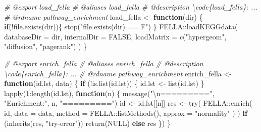 \documentclass[
]{article}
\newenvironment{Shaded}{\begin{snugshade}}{\end{snugshade}}
\newcommand{\AttributeTok}[1]{\textcolor[rgb]{0.77,0.63,0.00}{#1}}
\newcommand{\CommentTok}[1]{\textcolor[rgb]{0.56,0.35,0.01}{\textit{#1}}}
\newcommand{\ConstantTok}[1]{\textcolor[rgb]{0.00,0.00,0.00}{#1}}
\newcommand{\ControlFlowTok}[1]{\textcolor[rgb]{0.13,0.29,0.53}{\textbf{#1}}}
\newcommand{\DecValTok}[1]{\textcolor[rgb]{0.00,0.00,0.81}{#1}}
\newcommand{\FunctionTok}[1]{\textcolor[rgb]{0.00,0.00,0.00}{#1}}
\newcommand{\NormalTok}[1]{#1}
\newcommand{\OtherTok}[1]{\textcolor[rgb]{0.56,0.35,0.01}{#1}}
\newcommand{\SpecialCharTok}[1]{\textcolor[rgb]{0.00,0.00,0.00}{#1}}
\newcommand{\StringTok}[1]{\textcolor[rgb]{0.31,0.60,0.02}{#1}}
\begin{document}
\begin{Shaded}
\begin{Highlighting}[]
\CommentTok{\#\textquotesingle{} @export load\_fella}
\CommentTok{\#\textquotesingle{} @aliases load\_fella}
\CommentTok{\#\textquotesingle{} @description \textbackslash{}code\{load\_fella\}: ...}
\CommentTok{\#\textquotesingle{} @rdname pathway\_enrichment}
\NormalTok{load\_fella }\OtherTok{\textless{}{-}} \ControlFlowTok{function}\NormalTok{(dir) \{}
  \ControlFlowTok{if}\NormalTok{(}\SpecialCharTok{!}\FunctionTok{file.exists}\NormalTok{(dir))\{}
    \FunctionTok{stop}\NormalTok{(}\StringTok{"file.exists(dir) == F"}\NormalTok{)}
\NormalTok{  \}}
\NormalTok{  FELLA}\SpecialCharTok{::}\FunctionTok{loadKEGGdata}\NormalTok{(}
    \AttributeTok{databaseDir =}\NormalTok{ dir, }\AttributeTok{internalDir =} \ConstantTok{FALSE}\NormalTok{, }
    \AttributeTok{loadMatrix =} \FunctionTok{c}\NormalTok{(}\StringTok{"hypergeom"}\NormalTok{, }\StringTok{"diffusion"}\NormalTok{, }\StringTok{"pagerank"}\NormalTok{)}
\NormalTok{  )}
\NormalTok{\}}

\CommentTok{\#\textquotesingle{} @export enrich\_fella}
\CommentTok{\#\textquotesingle{} @aliases enrich\_fella}
\CommentTok{\#\textquotesingle{} @description \textbackslash{}code\{enrich\_fella\}: ...}
\CommentTok{\#\textquotesingle{} @rdname pathway\_enrichment}
\NormalTok{enrich\_fella }\OtherTok{\textless{}{-}} \ControlFlowTok{function}\NormalTok{(id.lst, data) \{}
  \ControlFlowTok{if}\NormalTok{ (}\SpecialCharTok{!}\FunctionTok{is.list}\NormalTok{(id.lst)) \{}
\NormalTok{    id.lst }\OtherTok{\textless{}{-}} \FunctionTok{list}\NormalTok{(id.lst)}
\NormalTok{  \}}
  \FunctionTok{lapply}\NormalTok{(}\DecValTok{1}\SpecialCharTok{:}\FunctionTok{length}\NormalTok{(id.lst),}
    \ControlFlowTok{function}\NormalTok{(n) \{}
      \FunctionTok{message}\NormalTok{(}\StringTok{"}\SpecialCharTok{\textbackslash{}n}\StringTok{========="}\NormalTok{, }\StringTok{"Enrichment:"}\NormalTok{, n, }\StringTok{"========="}\NormalTok{)}
\NormalTok{      id }\OtherTok{\textless{}{-}}\NormalTok{ id.lst[[n]]}
\NormalTok{      res }\OtherTok{\textless{}{-}} \FunctionTok{try}\NormalTok{(}
\NormalTok{        FELLA}\SpecialCharTok{::}\FunctionTok{enrich}\NormalTok{(}
\NormalTok{          id, }\AttributeTok{data =}\NormalTok{ data,}
          \AttributeTok{method =}\NormalTok{ FELLA}\SpecialCharTok{::}\FunctionTok{listMethods}\NormalTok{(),}
          \AttributeTok{approx =} \StringTok{"normality"}
\NormalTok{        )}
\NormalTok{      )}
      \ControlFlowTok{if}\NormalTok{ (}\FunctionTok{inherits}\NormalTok{(res, }\StringTok{"try{-}error"}\NormalTok{))}
        \FunctionTok{return}\NormalTok{(}\ConstantTok{NULL}\NormalTok{)}
      \ControlFlowTok{else}
\NormalTok{        res}
\NormalTok{    \})}
\NormalTok{\}}


\end{Highlighting}
\end{Shaded}
\end{document}
